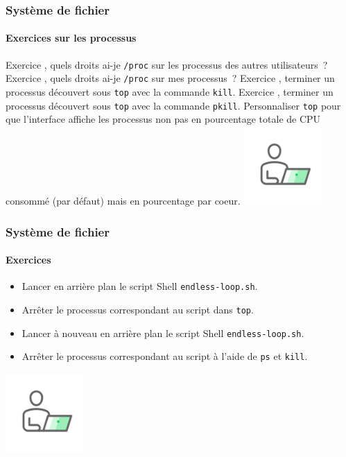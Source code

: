 \documentclass{beamer}
\begin{document}
    \begin{frame}
        \transdissolve
        \frametitle{Système de fichier}
        \framesubtitle{Exercices sur les processus}
        Exercice \execcounterdispinc{}, quels droits ai-je \lstinline{/proc} sur les processus des autres utilisateurs~?
        \bigbreak
        Exercice \execcounterdispinc{}, quels droits ai-je \lstinline{/proc} sur mes processus~?
        \bigbreak
        Exercice \execcounterdispinc{}, terminer un processus découvert sous \lstinline{top} avec la commande \lstinline{kill}.
        \bigbreak
        Exercice \execcounterdispinc{}, terminer un processus découvert sous \lstinline{top} avec la commande \lstinline{pkill}.
        \bigbreak
        Personnaliser \lstinline{top} pour que l'interface affiche les processus non pas en pourcentage totale de CPU consommé (par défaut) mais en pourcentage par coeur.
        \bigbreak
        \centering
        \includegraphics[width=3cm]{image/guy-in-front-of-desktop}
    \end{frame}

    \begin{frame}
        \transdissolve
        \frametitle{Système de fichier}
        \framesubtitle{Exercices \execcounterdispinc{}}
        \begin{itemize}
            \item Lancer en arrière plan le script Shell \lstinline{endless-loop.sh}.
            \item Arrêter le processus correspondant au script dans \lstinline{top}.
            \item Lancer à nouveau en arrière plan le script Shell \lstinline{endless-loop.sh}.
            \item Arrêter le processus correspondant au script à l'aide de  \lstinline{ps} et \lstinline{kill}.
        \end{itemize}
        \bigbreak
        \centering
        \includegraphics[width=3cm]{image/guy-in-front-of-desktop}
    \end{frame}
\end{document}
